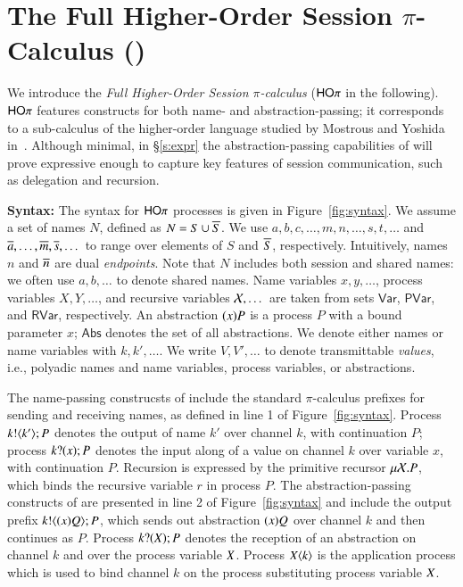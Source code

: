 \section{The Full Higher-Order Session $\pi$-Calculus (\HOp)}

We introduce the {\em Full Higher-Order Session $\pi$-calculus}
($\mathsf{HO}\pi$ in the following).
$\mathsf{HO}\pi$ features constructs for both name- and abstraction-passing;
it corresponds to a sub-calculus 
of the higher-order language studied by Mostrous and Yoshida in~\cite{tlca07}.
Although minimal, in \S\ref{s:expr}
the abstraction-passing capabilities of \HOp will prove 
expressive enough to capture key features of session communication, 
such as delegation and recursion.

{\bf Syntax:}
The syntax for $\mathsf{HO}\pi$ processes is given in Figure~\ref{fig:syntax}.
We assume a set of names $N$, defined as $N = S \cup \overline{S}$.
We use $a,b,c, \dots, m, n, \dots, s, t, \dots$ 
and $\overline{a}, \dots, \overline{m}, \overline{s}, \dots$
to range over elements of $S$ and $\overline{S}$, respectively.
Intuitively, names $n$ and $\overline{n}$ are dual \emph{endpoints}.
Note that $N$ includes both session and shared names:
we often use  $a,b, \dots$ to denote shared names.
Name variables $x, y,  \dots$, 
process variables $X, Y,  \dots$,
and recursive variables $\mathcal{X}, \dots$ 
are taken from sets $\mathsf{Var}$, $\mathsf{PVar}$, and $\mathsf{RVar}$, respectively. 
An abstraction $(x)P$ is a process $P$ with a bound parameter $x$;
$\mathsf{Abs}$ denotes the set of all abstractions.
We denote either names or name variables with $k, k', \dots$.
We write $V, V', \ldots$ to denote 
transmittable \emph{values}, i.e., 
polyadic names and name variables, process variables, or abstractions.

The name-passing construcsts of \HOp include the
standard $\pi$-calculus prefixes for sending and receiving names,
as defined in line 1 of Figure~\ref{fig:syntax}.
Process $k ! \langle k' \rangle ; P$ denotes the output of name $k'$ over channel $k$,
with continuation $P$;
process $k ? (x) ; P$ denotes the input along  of a value
on channel $k$ over variable $x$, with continuation $P$. 
Recursion is expressed by the primitive recursor $\mu \mathcal{X}. P$,
which binds the recursive variable $r$ in process $P$.
The abstraction-passing constructs of \HOp are presented in line
2 of Figure~\ref{fig:syntax} and include 
the output prefix $k ! \langle (x)Q \rangle ; P$, which 
sends out abstraction $(x)Q$ over channel $k$ and then continues as $P$. 
Process $k ? (X) ; P$ denotes the reception of an abstraction
on channel $k$ and over the process variable $X$.
Process $X\langle k \rangle$ is the application
process which is used to bind channel $k$ on the process
substituting process variable $X$.

